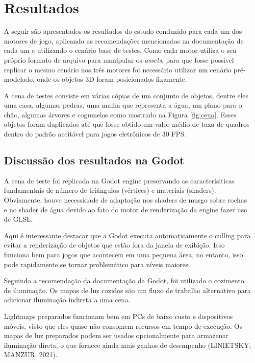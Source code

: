 \chapter{Resultados}
\label{chap:resultados}

A seguir são apresentados os resultados do estudo conduzido para cada um dos motores de jogo, aplicando as recomendações mencionadas na documentação de cada um e utilizando o cenário base de testes. Como cada motor utiliza o seu próprio formato de arquivo para manipular os \textit{assets}, para que fosse possível replicar o mesmo cenário nos três motores foi necessário utilizar um cenário pré-modelado, onde os objetos 3D foram posicionados fixamente.

A cena de testes consiste em várias cópias de um conjunto de objetos, dentre eles uma casa, algumas pedras, uma malha que representa a água, um plano para o chão, algumas árvores e cogumelos como mostrado na Figura \ref{fig:cena}. Esses objetos foram duplicados até que fosse obtido um valor médio de taxa de quadros dentro do padrão aceitável para jogos eletrônicos de 30 FPS.



\section{Discussão dos resultados na Godot}
\label{sec:resultado-godot}

A cena de teste foi replicada na Godot engine preservando as caracterísiticas fundamentais de número de triângulos (vértices) e materiais (shaders). Obviamente, houve necessidade de adaptação nos shaders de musgo sobre rochas e no shader de água devido ao fato do motor de renderização da engine fazer uso de GLSL.

Aqui é interessante destacar que a Godot executa automaticamente o culling para evitar a renderização de objetos que estão fora da janela de exibição. Isso funciona bem para jogos que acontecem em uma pequena área, no entanto, isso pode rapidamente se tornar problemático para níveis maiores.

Seguindo a recomendação da documentação da Godot, foi utilizado o cozimento de iluminação. Os mapas de luz cozidos são um fluxo de trabalho alternativo para adicionar iluminação indireta a uma cena. 

Lightmaps preparados funcionam bem em PCs de baixo custo e dispositivos móveis, visto que eles quase não consomem recursos em tempo de execução. Os mapas de luz preparados podem ser usados opcionalmente para armazenar iluminação direta, o que fornece ainda mais ganhos de desempenho (LINIETSKY; MANZUR, 2021)\nocite{manzur2021}.

